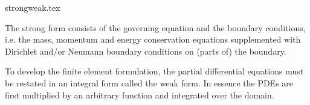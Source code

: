 \begin{flushright} {\tiny {\color{gray} strongweak.tex}} \end{flushright}


The strong form consists of the governing equation and the boundary conditions, i.e. 
the mass, momentum and energy conservation equations supplemented with Dirichlet and/or Neumann
boundary conditions on (parts of) the boundary.


To develop the finite element formulation, the partial differential equations 
must be restated in an integral form called the weak form. In essence the PDEs are 
first multiplied by an arbitrary function and integrated over the domain.

 

